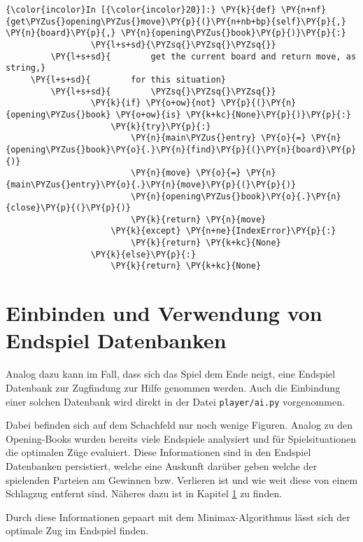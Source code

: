     \begin{Verbatim}[commandchars=\\\{\}]
{\color{incolor}In [{\color{incolor}20}]:} \PY{k}{def} \PY{n+nf}{get\PYZus{}opening\PYZus{}move}\PY{p}{(}\PY{n+nb+bp}{self}\PY{p}{,} \PY{n}{board}\PY{p}{,} \PY{n}{opening\PYZus{}book}\PY{p}{)}\PY{p}{:}
                 \PY{l+s+sd}{\PYZsq{}\PYZsq{}\PYZsq{}}
         \PY{l+s+sd}{        get the current board and return move, as string,} 
	 \PY{l+s+sd}{        for this situation}
         \PY{l+s+sd}{        \PYZsq{}\PYZsq{}\PYZsq{}}
                 \PY{k}{if} \PY{o+ow}{not} \PY{p}{(}\PY{n}{opening\PYZus{}book} \PY{o+ow}{is} \PY{k+kc}{None}\PY{p}{)}\PY{p}{:}
                     \PY{k}{try}\PY{p}{:}
                         \PY{n}{main\PYZus{}entry} \PY{o}{=} \PY{n}{opening\PYZus{}book}\PY{o}{.}\PY{n}{find}\PY{p}{(}\PY{n}{board}\PY{p}{)}
                         \PY{n}{move} \PY{o}{=} \PY{n}{main\PYZus{}entry}\PY{o}{.}\PY{n}{move}\PY{p}{(}\PY{p}{)}
                         \PY{n}{opening\PYZus{}book}\PY{o}{.}\PY{n}{close}\PY{p}{(}\PY{p}{)}
                         \PY{k}{return} \PY{n}{move}
                     \PY{k}{except} \PY{n+ne}{IndexError}\PY{p}{:}
                         \PY{k}{return} \PY{k+kc}{None}
                 \PY{k}{else}\PY{p}{:}
                     \PY{k}{return} \PY{k+kc}{None}
\end{Verbatim}

    \section{Einbinden und Verwendung von Endspiel
Datenbanken}\label{einbinden-und-verwendung-von-endspiel-datenbanken}

Analog dazu kann im Fall, dass sich das Spiel dem Ende neigt, eine
Endspiel Datenbank zur Zugfindung zur Hilfe genommen werden. Auch die
Einbindung einer solchen Datenbank wird direkt in der Datei
\texttt{player/ai.py} vorgenommen.

Dabei befinden sich auf dem Schachfeld nur noch wenige Figuren. Analog
zu den Opening-Books wurden bereits viele Endspiele analysiert und für
Spielsituationen die optimalen Züge evaluiert. Diese Informationen sind
in den Endspiel Datenbanken persistiert, welche eine Auskunft darüber
geben welche der spielenden Parteien am Gewinnen bzw. Verlieren ist und
wie weit diese von einem Schlagzug entfernt sind. Näheres dazu ist in
Kapitel \ref{einbinden-und-verwendung-von-endspiel-datenbanken} zu finden.

Durch diese Informationen gepaart mit dem Minimax-Algorithmus lässt sich
der optimale Zug im Endspiel finden.

